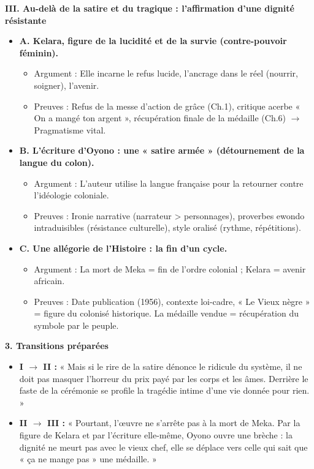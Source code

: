 \documentclass[11pt]{article}
\begin{document}
\begin{exoresolu}
\textbf{III. Au-delà de la satire et du tragique : l'affirmation d'une dignité résistante}
\begin{itemize}
    \item \textbf{A. Kelara, figure de la lucidité et de la survie (contre-pouvoir féminin).}
    \begin{itemize}
        \item Argument : Elle incarne le refus lucide, l'ancrage dans le réel (nourrir, soigner), l'avenir.
        \item Preuves : Refus de la messe d'action de grâce (Ch.1), critique acerbe « On a mangé ton argent », récupération finale de la médaille (Ch.6) $\to$ Pragmatisme vital.
    \end{itemize}
    \item \textbf{B. L'écriture d'Oyono : une « satire armée » (détournement de la langue du colon).}
    \begin{itemize}
        \item Argument : L'auteur utilise la langue française pour la retourner contre l'idéologie coloniale.
        \item Preuves : Ironie narrative (narrateur > personnages), proverbes ewondo intraduisibles (résistance culturelle), style oralisé (rythme, répétitions).
    \end{itemize}
    \item \textbf{C. Une allégorie de l'Histoire : la fin d'un cycle.}
    \begin{itemize}
        \item Argument : La mort de Meka = fin de l'ordre colonial ; Kelara = avenir africain.
        \item Preuves : Date publication (1956), contexte loi-cadre, « Le Vieux nègre » = figure du colonisé historique. La médaille vendue = récupération du symbole par le peuple.
    \end{itemize}
\end{itemize}

\textbf{3. Transitions préparées}
\begin{itemize}
    \item \textbf{I $\to$ II :} « Mais si le rire de la satire dénonce le ridicule du système, il ne doit pas masquer l'horreur du prix payé par les corps et les âmes. Derrière le faste de la cérémonie se profile la tragédie intime d'une vie donnée pour rien. »
    \item \textbf{II $\to$ III :} « Pourtant, l'œuvre ne s'arrête pas à la mort de Meka. Par la figure de Kelara et par l'écriture elle-même, Oyono ouvre une brèche : la dignité ne meurt pas avec le vieux chef, elle se déplace vers celle qui sait que « ça ne mange pas » une médaille. »
\end{itemize}
\end{exoresolu}
\end{document}
